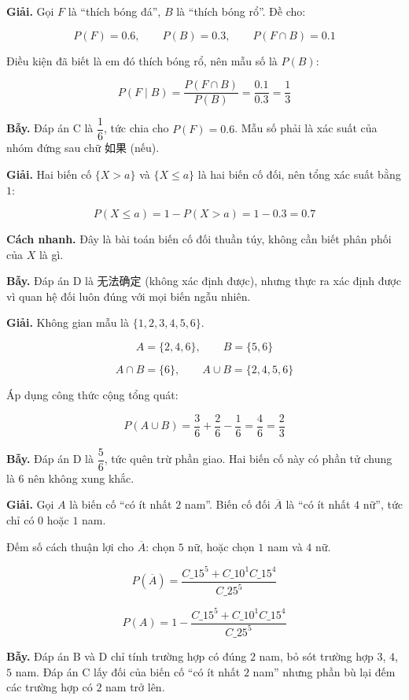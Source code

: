 \documentclass[11pt, a4paper]{article}
\begin{document}
\begin{dapan}[11 — Đáp án A]
\textbf{Giải.} Gọi $F$ là “thích bóng đá”, $B$ là “thích bóng rổ”. Đề cho:

$$P(F) = 0.6, \qquad P(B) = 0.3, \qquad P(F \cap B) = 0.1$$

Điều kiện đã biết là em đó thích bóng rổ, nên mẫu số là $P(B)$:

$$P(F \mid B) = \frac{P(F \cap B)}{P(B)} = \frac{0.1}{0.3} = \frac{1}{3}$$

\textbf{Bẫy.} Đáp án C là $\dfrac{1}{6}$, tức chia cho $P(F) = 0.6$. Mẫu số phải là xác suất của nhóm đứng sau chữ 如果 (nếu).
\end{dapan}

\begin{dapan}[12 — Đáp án C]
\textbf{Giải.} Hai biến cố $\{X > a\}$ và $\{X \le a\}$ là hai biến cố đối, nên tổng xác suất bằng $1$:

$$P(X \le a) = 1 - P(X > a) = 1 - 0.3 = 0.7$$

\textbf{Cách nhanh.} Đây là bài toán biến cố đối thuần túy, không cần biết phân phối của $X$ là gì.

\textbf{Bẫy.} Đáp án D là 无法确定 (không xác định được), nhưng thực ra xác định được vì quan hệ đối luôn đúng với mọi biến ngẫu nhiên.
\end{dapan}

\begin{dapan}[13 — Đáp án C]
\textbf{Giải.} Không gian mẫu là $\{1,2,3,4,5,6\}$.

$$A = \{2, 4, 6\}, \qquad B = \{5, 6\}$$

$$A \cap B = \{6\}, \qquad A \cup B = \{2, 4, 5, 6\}$$

Áp dụng công thức cộng tổng quát:

$$P(A \cup B) = \frac{3}{6} + \frac{2}{6} - \frac{1}{6} = \frac{4}{6} = \frac{2}{3}$$

\textbf{Bẫy.} Đáp án D là $\dfrac{5}{6}$, tức quên trừ phần giao. Hai biến cố này có phần tử chung là $6$ nên không xung khắc.
\end{dapan}

\begin{dapan}[14 — Đáp án A]
\textbf{Giải.} Gọi $A$ là biến cố “có ít nhất $2$ nam”. Biến cố đối $\overline{A}$ là “có ít nhất $4$ nữ”, tức chỉ có $0$ hoặc $1$ nam.

Đếm số cách thuận lợi cho $\overline{A}$: chọn $5$ nữ, hoặc chọn $1$ nam và $4$ nữ.

$$P(\overline{A}) = \frac{C\_{15}^5 + C\_{10}^1 C\_{15}^4}{C\_{25}^5}$$

$$P(A) = 1 - \frac{C\_{15}^5 + C\_{10}^1 C\_{15}^4}{C\_{25}^5}$$

\textbf{Bẫy.} Đáp án B và D chỉ tính trường hợp có đúng $2$ nam, bỏ sót trường hợp $3$, $4$, $5$ nam. Đáp án C lấy đối của biến cố “có ít nhất $2$ nam” nhưng phần bù lại đếm các trường hợp có $2$ nam trở lên.
\end{dapan}
\end{document}
